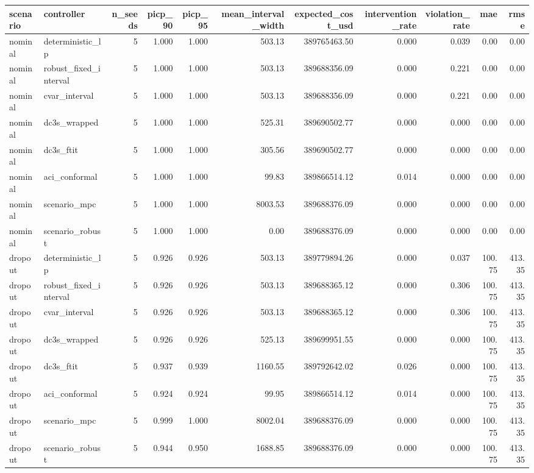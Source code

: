 \begin{tabular}{llrrrrrrrrr}
\toprule
scenario & controller & n\_seeds & picp\_90 & picp\_95 & mean\_interval\_width & expected\_cost\_usd & intervention\_rate & violation\_rate & mae & rmse \\
\midrule
nominal & deterministic\_lp & 5 & 1.000 & 1.000 & 503.13 & 389765463.50 & 0.000 & 0.039 & 0.00 & 0.00 \\
nominal & robust\_fixed\_interval & 5 & 1.000 & 1.000 & 503.13 & 389688356.09 & 0.000 & 0.221 & 0.00 & 0.00 \\
nominal & cvar\_interval & 5 & 1.000 & 1.000 & 503.13 & 389688356.09 & 0.000 & 0.221 & 0.00 & 0.00 \\
nominal & dc3s\_wrapped & 5 & 1.000 & 1.000 & 525.31 & 389690502.77 & 0.000 & 0.000 & 0.00 & 0.00 \\
nominal & dc3s\_ftit & 5 & 1.000 & 1.000 & 305.56 & 389690502.77 & 0.000 & 0.000 & 0.00 & 0.00 \\
nominal & aci\_conformal & 5 & 1.000 & 1.000 & 99.83 & 389866514.12 & 0.014 & 0.000 & 0.00 & 0.00 \\
nominal & scenario\_mpc & 5 & 1.000 & 1.000 & 8003.53 & 389688376.09 & 0.000 & 0.000 & 0.00 & 0.00 \\
nominal & scenario\_robust & 5 & 1.000 & 1.000 & 0.00 & 389688376.09 & 0.000 & 0.000 & 0.00 & 0.00 \\
dropout & deterministic\_lp & 5 & 0.926 & 0.926 & 503.13 & 389779894.26 & 0.000 & 0.037 & 100.75 & 413.35 \\
dropout & robust\_fixed\_interval & 5 & 0.926 & 0.926 & 503.13 & 389688365.12 & 0.000 & 0.306 & 100.75 & 413.35 \\
dropout & cvar\_interval & 5 & 0.926 & 0.926 & 503.13 & 389688365.12 & 0.000 & 0.306 & 100.75 & 413.35 \\
dropout & dc3s\_wrapped & 5 & 0.926 & 0.926 & 525.13 & 389699951.55 & 0.000 & 0.000 & 100.75 & 413.35 \\
dropout & dc3s\_ftit & 5 & 0.937 & 0.939 & 1160.55 & 389792642.02 & 0.026 & 0.000 & 100.75 & 413.35 \\
dropout & aci\_conformal & 5 & 0.924 & 0.924 & 99.95 & 389866514.12 & 0.014 & 0.000 & 100.75 & 413.35 \\
dropout & scenario\_mpc & 5 & 0.999 & 1.000 & 8002.04 & 389688376.09 & 0.000 & 0.000 & 100.75 & 413.35 \\
dropout & scenario\_robust & 5 & 0.944 & 0.950 & 1688.85 & 389688376.09 & 0.000 & 0.000 & 100.75 & 413.35 \\

\end{tabular}
